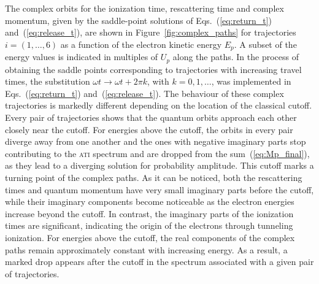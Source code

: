 The complex orbits for the ionization time, rescattering time and
complex momentum, given by the saddle-point solutions of
Eqs.~(\ref{eq:return_t}) and~(\ref{eq:release_t}), are shown in
Figure~\ref{fig:complex_paths} for trajectories $i = (1,\dots,6)$ as a
function of the electron kinetic energy $E_{p}$. A subset of the
energy values is indicated in multiples of $U_{p}$ along the paths. In
the process of obtaining the saddle points corresponding to
trajectories with increasing travel times, the substitution $\omega t
\to \omega t + 2\pi k$, with $k = 0,1,\dots$, was implemented in
Eqs.~(\ref{eq:return_t}) and~(\ref{eq:release_t}). The behaviour of
these complex trajectories is markedly different depending on the
location of the classical cutoff. Every pair of trajectories shows
that the quantum orbits approach each other closely near the
cutoff. For energies above the cutoff, the orbits in every pair
diverge away from one another and the ones with negative imaginary
parts stop contributing to the \textsc{ati} spectrum and are dropped
from the sum~(\ref{eq:Mp_final}), as they lead to a diverging solution
for probability amplitude. This cutoff marks a turning point of the
complex paths. As it can be noticed, both the rescattering times and
quantum momentum have very small imaginary parts before the cutoff,
while their imaginary components become noticeable as the electron
energies increase beyond the cutoff. In contrast, the imaginary parts
of the ionization times are significant, indicating the origin of the
electrons through tunneling ionization. For energies above the cutoff,
the real components of the complex paths remain approximately constant
with increasing energy. As a result, a marked drop appears after the
cutoff in the spectrum associated with a given pair of trajectories.

